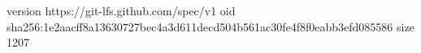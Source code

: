 version https://git-lfs.github.com/spec/v1
oid sha256:1e2aacff8a13630727bec4a3d611decd504b561ac30fe4f8f0eabb3efd085586
size 1207
